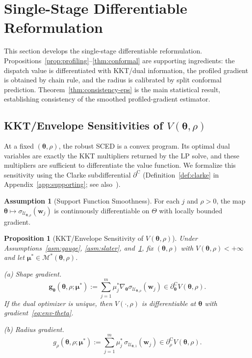 \documentclass[11pt]{article}
\newcommand{\cU}{\mathcal{U}}
\newcommand{\cM}{\mathcal{M}}
\newcommand{\btheta}{\bm{\theta}}
\newcommand{\bmu}{\bm{\mu}}
\newcommand{\bw}{\bm{w}}
\newcommand{\bg}{\bm{g}}
\newcommand{\clsubd}{\partial^{\mathrm{C}}}
\newtheorem{proposition}[theorem]{Proposition}
\theoremstyle{definition}
\newtheorem{assumption}{Assumption}
\begin{document}
\section{Single-Stage Differentiable Reformulation}
\label{sec:methodology}

This section develops the single-stage differentiable reformulation. Propositions~\ref{prop:profiling}--\ref{thm:conformal} are supporting ingredients: the dispatch value is differentiated with KKT/dual information, the profiled gradient is obtained by chain rule, and the radius is calibrated by split conformal prediction. Theorem~\ref{thm:consistency-eps} is the main statistical result, establishing consistency of the smoothed profiled-gradient estimator.

\subsection{KKT/Envelope Sensitivities of \texorpdfstring{$V(\btheta,\rho)$}{V(theta, rho)}}

At a fixed $(\btheta,\rho)$, the robust SCED is a convex program. Its optimal dual variables are exactly the KKT multipliers returned by the LP solve, and these multipliers are sufficient to differentiate the value function. We formalize this sensitivity using the Clarke subdifferential $\clsubd$ (Definition~\ref{def:clarke} in Appendix~\ref{app:supporting}; see also~\citet{clarke1990optimization}).

\begin{assumption}[Support Function Smoothness]\label{asm:sigma-diff}
For each $j$ and $\rho>0$, the map $\btheta\mapsto \sigma_{\cU_{\btheta,\rho}}(\bw_j)$ is continuously differentiable on $\Theta$ with locally bounded gradient.
\end{assumption}

\begin{proposition}[KKT/Envelope Sensitivity of $V(\btheta,\rho)$]\label{thm:envelope}
Under Assumptions~\ref{asm:gauge}, \ref{asm:slater}, and~\ref{asm:sigma-diff}, fix $(\btheta,\rho)$ with $V(\btheta,\rho)<+\infty$ and let $\bmu^*\in\cM^*(\btheta,\rho)$.

\emph{(a) Shape gradient.}
\begin{equation}\label{eq:env-theta}
\bg_{\btheta}(\btheta,\rho;\bmu^*) := \sum_{j=1}^m \mu_j^* \nabla_{\btheta} \sigma_{\cU_{\btheta,\rho}}(\bw_j) \in \clsubd_{\btheta} V(\btheta,\rho).
\end{equation}
If the dual optimizer is unique, then $V(\cdot,\rho)$ is differentiable at $\btheta$ with gradient~\eqref{eq:env-theta}.

\emph{(b) Radius gradient.}
\begin{equation}\label{eq:env-rho}
g_{\rho}(\btheta,\rho;\bmu^*) := \sum_{j=1}^m \mu_j^*\,\sigma_{\cU_{\btheta,1}}(\bw_j) \in \clsubd_{\rho}V(\btheta,\rho).
\end{equation}
\end{proposition}
\end{document}
